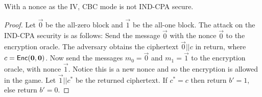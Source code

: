
\begin{theorem} \label{thm:nonce_cbc_is_nt_ind_cpa}
  With a nonce as the IV, CBC mode is not IND-CPA secure.
\end{theorem}

\begin{proof}
  Let $\vec{0}$ be the all-zero block and $\vec{1}$ be the all-one block. The
  attack on the \textsf{IND-CPA} security is as follows:
  Send the message $\vec{0}$ with the nonce $\vec{0}$ to the
  encryption oracle. The adversary obtains the ciphertext $\vec{0}||c$ in
  return, where $c = \textsf{Enc}(\mathbf{0}, \mathbf{0})$. Now send the messages
  $m_0 = \vec{0}$ and $m_1 = \vec{1}$ to the encryption oracle, with nonce
  $\vec{1}$. Notice this is a new nonce and so the encryption is allowed in the
  game. Let $\vec{1}||c^*$ be the returned ciphertext. If $c^* = c$ then return
  $b' = 1$, else return $b' = 0$.
\end{proof}

